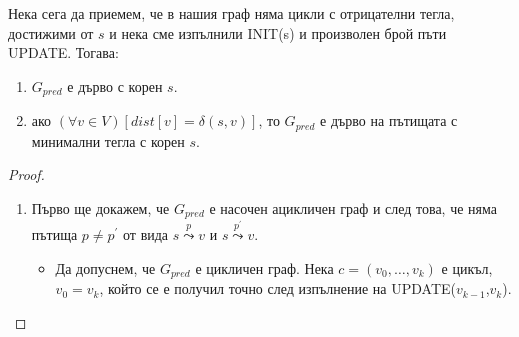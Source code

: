 \begin{prop}
  \label{prop:tree-shortest-path}
  Нека сега да приемем, че в нашия граф няма цикли с отрицателни тегла, достижими от $s$
  и нека сме изпълнили INIT(s) и произволен брой пъти UPDATE.
  Тогава:
  \begin{enumerate}[1)]
  \item 
    $G_{pred}$ е дърво с корен $s$.
  \item
    ако $(\forall v\in V)[dist[v] = \delta(s,v)]$, то $G_{pred}$ е дърво на пътищата с минимални тегла с корен $s$.
  \end{enumerate}
\end{prop}
\begin{proof}
  \begin{enumerate}[1)]
  \item 
    Първо ще докажем, че $G_{pred}$ е насочен ацикличен граф и след
    това, че няма пътища $p \neq p^\prime$ от вида $s\stackrel{p}{\leadsto} v$ и $s\stackrel{p^\prime}{\leadsto} v$.
    \begin{itemize}
    \item 
      Да допуснем, че $G_{pred}$ е цикличен граф.
      Нека $c = (v_0,\dots,v_k)$ е цикъл, $v_0 = v_k$, който се е получил точно след изпълнение на 
      UPDATE($v_{k-1}$,$v_k$).


\end{itemize}
\end{enumerate}
\end{proof}
